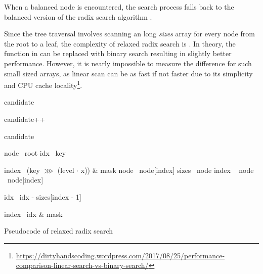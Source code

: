 When a balanced node is encountered, the search process falls back to the balanced version of the radix search algorithm .

Since the tree traversal involves scanning an \m{} long \emph{sizes} array for every node from the root to a leaf, the complexity of relaxed radix search is . In theory, the  function in  can be replaced with binary search resulting in slightly better  performance. However, it is nearly impossible to measure the difference for such small sized arrays, as linear scan can be as fast if not faster due to its simplicity and CPU cache locality\footnote{\url{https://dirtyhandscoding.wordpress.com/2017/08/25/performance-comparison-linear-search-vs-binary-search/}}.

\begin{listing}[!ht]

    \begin{algorithmic}[1]
            \State candidate 

                \State candidate++
            \EndIf

            \State \Return candidate
        \EndFunction

        \State

            \State node \la\ root
            \State idx \la\ key

                    \State index \la\ (key $\ggg$ (level $\cdot$ x)) \& mask
                    \State node \la\ node[index]
                \Else
                    \State sizes \la\ node
                    \State index \la\ 
                    \State node \la\ node[index]

                        \State idx \la\ idx - sizes[index - 1]
                    \EndIf
                \EndIf
            \EndFor

            \State index \la\ idx \& mask
            \State {}
        \EndFunction
    \end{algorithmic}

    \caption{Pseudocode of relaxed radix search}
    \label{lst:rrb-tree-relaxed-radix-search}
\end{listing}

